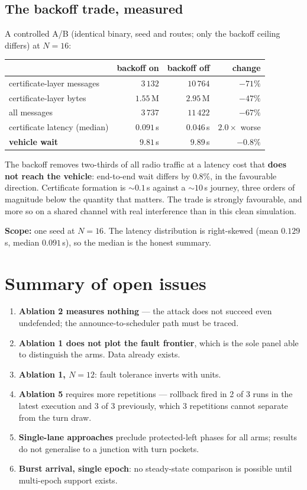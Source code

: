 \documentclass[11pt,a4paper]{article}
\newcommand{\caveat}[1]{\textcolor{red!60!black}{\textbf{#1}}}
\begin{document}
\subsection*{The backoff trade, measured}

A controlled A/B (identical binary, seed and routes; only the backoff ceiling
differs) at $N{=}16$:

\begin{center}
\begin{tabular}{lrrr}
\toprule
& backoff on & backoff off & change \\
\midrule
certificate-layer messages & $3\,132$ & $10\,764$ & $-71\%$ \\
certificate-layer bytes    & $1.55$\,M & $2.95$\,M & $-47\%$ \\
all messages               & $3\,737$ & $11\,422$ & $-67\%$ \\
certificate latency (median) & $0.091$\,s & $0.046$\,s & $2.0\times$ worse \\
\textbf{vehicle wait}      & $9.81$\,s & $9.89$\,s & $-0.8\%$ \\
\bottomrule
\end{tabular}
\end{center}

\noindent
The backoff removes two-thirds of all radio traffic at a latency cost that
\textbf{does not reach the vehicle}: end-to-end wait differs by $0.8\%$, in the
favourable direction. Certificate formation is ${\sim}0.1$\,s against a
${\sim}10$\,s journey, three orders of magnitude below the quantity that
matters. The trade is strongly favourable, and more so on a shared channel with
real interference than in this clean simulation.

\caveat{Scope:} one seed at $N{=}16$. The latency distribution is
right-skewed (mean $0.129$\,s, median $0.091$\,s), so the median is the honest
summary.

\section{Summary of open issues}

\begin{enumerate}
\item \textbf{Ablation 2 measures nothing} --- the attack does not succeed even
      undefended; the announce-to-scheduler path must be traced.
\item \textbf{Ablation 1 does not plot the fault frontier}, which is the sole
      panel able to distinguish the arms. Data already exists.
\item \textbf{Ablation 1, $N{=}12$}: fault tolerance inverts with units.
\item \textbf{Ablation 5} requires more repetitions --- rollback fired in 2 of 3
      runs in the latest execution and 3 of 3 previously, which 3 repetitions
      cannot separate from the turn draw.
\item \textbf{Single-lane approaches} preclude protected-left phases for all
      arms; results do not generalise to a junction with turn pockets.
\item \textbf{Burst arrival, single epoch}: no steady-state comparison is
      possible until multi-epoch support exists.
\end{enumerate}
\end{document}
